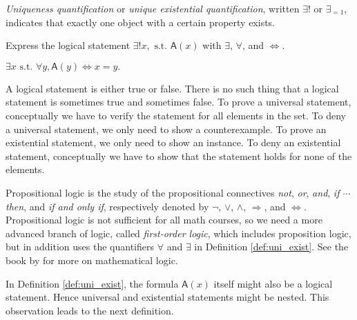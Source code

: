 \begin{defn}
  \emph{Uniqueness quantification}
   or \emph{unique existential quantification},
   written $\exists!$ or $\exists_{=1}$, 
   indicates that exactly one object with a certain property exists.
\end{defn}

\begin{exc}
  Express the logical statement $\exists! x, \text{ s.t. } \mathsf{A}(x)$
   with $\exists$, $\forall$, and $\Leftrightarrow$.
\end{exc}
\begin{solution}
  $\exists x \text{ s.t. }\forall y, \mathsf{A}(y) \Leftrightarrow x=y.$
\end{solution}

 \begin{rem}
A logical statement is either true or false.
There is no such thing that
 a logical statement is sometimes true and sometimes false.
To prove a universal statement,
 conceptually we have to verify the statement
 for all elements in the set.
To deny a universal statement,
 we only need to show a counterexample.
To prove an existential statement,
 we only need to show an instance.
To deny an existential statement,
 conceptually we have to show that the statement holds
 for none of the elements.
 \end{rem}

 \begin{rem}
   \label{rem:firstOrderLogicAndPropLogic}
   Propositional logic is the study
   of the propositional connectives
   \emph{not}, \emph{or}, \emph{and},
   \emph{if $\cdots$ then},
   and \emph{if and only if},
   respectively denoted by $\neg$,
   $\vee$, $\wedge$, $\Rightarrow$,
   and $\Leftrightarrow$.
   Propositional logic is not sufficient
   for all math courses,
   so we need a more advanced branch
   of logic, called
   \emph{first-order logic},
   which includes proposition logic,
   but in addition uses the quantifiers
   $\forall$ and $\exists$ in Definition \ref{def:uni_exist}.
   See the book by \cite{hodel13:_introd_mathem_logic}
   for more on mathematical logic.
 \end{rem}
 
 \begin{rem}
   In Definition \ref{def:uni_exist},
    the formula $\mathsf{A}(x)$ itself
    might also be a logical statement.
   Hence universal and existential statements
    might be nested.
   This observation leads to the next definition.
 \end{rem}

